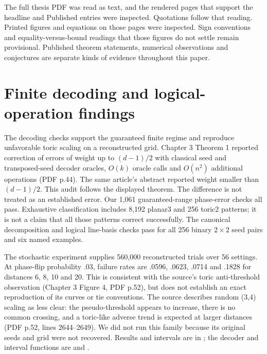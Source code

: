The full thesis PDF was read as text, and the rendered pages that support the headline and Published entries were inspected. Quotations follow that reading. Printed figures and equations on those pages were inspected. Sign conventions and equality-versus-bound readings that those figures do not settle remain provisional. Published theorem statements, numerical observations and conjectures are separate kinds of evidence throughout this paper.

\section{Finite decoding and logical-operation findings}
The decoding checks support the guaranteed finite regime and reproduce unfavorable toric scaling on a reconstructed grid. Chapter 3 Theorem 1 reported correction of errors of weight up to $(d-1)/2$ with classical seed and transposed-seed decoder oracles, $O(k)$ oracle calls and $O(n^2)$ additional operations (PDF p.44). The same article's abstract reported weight smaller than $(d-1)/2$. This audit follows the displayed theorem. The difference is not treated as an established error. Our 1,061 guaranteed-range phase-error checks all pass. Exhaustive classification includes 8,192 planar3 and 256 toric2 patterns; it is not a claim that all those patterns correct successfully. The canonical decomposition and logical line-basis checks pass for all 256 binary $2\times2$ seed pairs and six named examples.

The stochastic experiment supplies 560,000 reconstructed trials over 56 settings. At phase-flip probability .03, failure rates are .0596, .0623, .0714 and .1828 for distances 6, 8, 10 and 20. This is consistent with the source's toric anti-threshold observation (Chapter 3 Figure 4, PDF p.52), but does not establish an exact reproduction of its curves or tie conventions. The source describes random (3,4) scaling as less clear: the pseudo-threshold appears to increase, there is no common crossing, and a toric-like adverse trend is expected at larger distances (PDF p.52, lines 2644--2649). We did not run this family because its original seeds and grid were not recovered. Results and intervals are in \href{https://github.com/alectionary/vibe-math/blob/master/formalization/quintavalle-hgp/results/toric_noise.json}{}; the decoder and interval functions are \href{https://github.com/alectionary/vibe-math/blob/master/formalization/quintavalle-hgp/analysis/toric_noise.py#L15}{} and \href{https://github.com/alectionary/vibe-math/blob/master/formalization/quintavalle-hgp/analysis/toric_noise.py#L39}{}.

